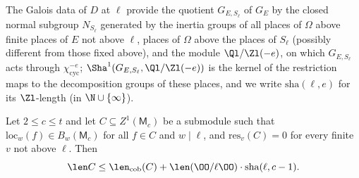 \begin{definition}\label{pf:linkN:shadef}
The Galois data of $D$ at $\ell$ provide the quotient $G_{E,S_\ell}$ of $G_E$ by the closed normal subgroup $N_{S_\ell}$ generated by the inertia
groups of all places of $\Omega$ above finite places of $E$ not above $\ell$, places of $\Omega$ above the places of $S_\ell$ (possibly different
from those fixed above), and the module $\Ql/\Zl(-e)$, on which $G_{E,S_\ell}$ acts through $\chi_{\mathrm{cyc}}^{-e}$; $\Sha^1(G_{E,S_\ell},\Ql/\Zl(-e))$
is the kernel of the restriction maps to the decomposition groups of these places, and we write $\mathrm{sha}(\ell,e)$ for its $\Zl$-length (in
$\N\cup\{\infty\}$).
\end{definition}

\begin{lemma}\label{pf:linkN:shabound}
Let $2\le c\le t$ and let $C\subseteq Z^1(\mathsf M_c)$ be a submodule such that $\mathrm{loc}_w(f)\in B_w(\mathsf M_c)$ for all $f\in C$ and
$w\mid\ell$, and $\mathrm{res}_v(C)=0$ for every finite $v$ not above $\ell$. Then
\[
\len C\le\len_{\mathrm{cob}}(C)+\len(\OO/\ell\OO)\cdot\mathrm{sha}(\ell,c-1).
\]
\end{lemma}

